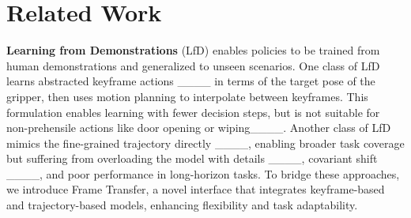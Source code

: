 \section{Related Work}

\textbf{Learning from Demonstrations} (LfD) enables policies to be trained from human demonstrations and generalized to unseen scenarios. 
One class of LfD learns abstracted keyframe actions ____ in terms of the target pose of the gripper, then uses motion planning to interpolate between keyframes. This formulation enables learning with fewer decision steps, but is not suitable for non-prehensile actions like door opening or wiping____.
Another class of LfD mimics the fine-grained trajectory directly
____, enabling broader task coverage but suffering from overloading
the model with details ____, covariant shift ____, and poor performance in long-horizon tasks. To bridge these approaches, we introduce Frame Transfer, a novel interface that integrates keyframe-based and trajectory-based models, enhancing flexibility and task adaptability.



